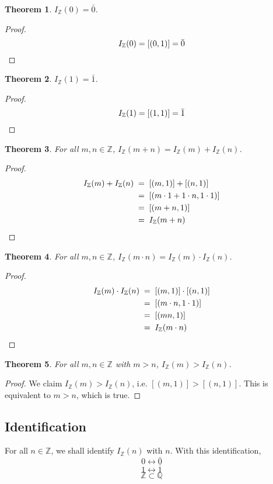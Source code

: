 \documentclass[10pt]{article}
\newtheorem{theorem}{Theorem}[section]
\theoremstyle{definition}
\theoremstyle{remark}
\newcommand{\Z}{\mathbb{Z}}
\newcommand{\Q}{\mathbb{Q}}
\newcommand{\IdZ}{I_{\Z}}
\begin{document}
        \begin{theorem}
                $\IdZ(0) = \bar{0}$.
        \end{theorem}
        \begin{proof}
                \[\IdZ(0) = [(0, 1)] = \bar{0} \qedhere\]
        \end{proof}

        \begin{theorem}
                $\IdZ(1) = \bar{1}$.
        \end{theorem}
        \begin{proof}
                \[\IdZ(1) = [(1, 1)] = \bar{1} \qedhere\]
        \end{proof}

        \begin{theorem}
                For all $m, n \in \Z$, $\IdZ(m + n) = \IdZ(m) + \IdZ(n)$.
        \end{theorem}
        \begin{proof}
                \begin{align*}
                        \IdZ(m) + \IdZ(n) \;&=\; [(m, 1)] + [(n, 1)] \\
                                \;&=\; [(m\cdot 1 + 1\cdot n, 1\cdot 1)] \\
                                \;&=\; [(m + n, 1)] \\
                                \;&=\; \IdZ(m + n) \qedhere
                \end{align*}
        \end{proof}

        \begin{theorem}
                For all $m, n \in \Z$, $\IdZ(m \cdot n) = \IdZ(m) \cdot \IdZ(n)$.
        \end{theorem}
        \begin{proof}
                \begin{align*}
                        \IdZ(m) \cdot \IdZ(n) \;&=\; [(m, 1)] \cdot [(n, 1)] \\
                                \;&=\; [(m\cdot n, 1\cdot 1)] \\
                                \;&=\; [(mn, 1)] \\
                                \;&=\; \IdZ(m \cdot n) \qedhere
                \end{align*}
        \end{proof}

        \begin{theorem}
                For all $m, n \in \Z$ with $m > n$, $\IdZ(m) > \IdZ(n)$.
        \end{theorem}
        \begin{proof}
                We claim $\IdZ(m) > \IdZ(n)$, i.e. $[(m, 1)] > [(n, 1)]$.
                This is equivalent to $m > n$, which is true.
        \end{proof}
        
        \subsection*{Identification}
        For all $n \in \Z$, we shall identify $\IdZ(n)$ with $n$.
        With this identification,
        \[0 \leftrightarrow \bar{0}\]
        \[1 \leftrightarrow \bar{1}\]
        \[\Z \subset \Q\]
\end{document}
